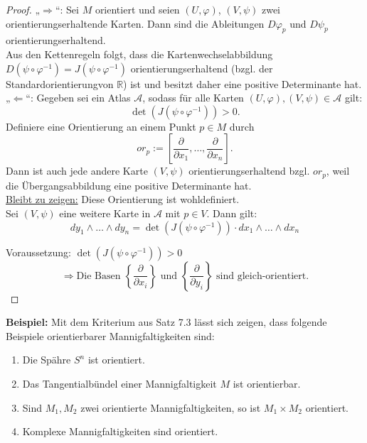 \documentclass[fleqn, 12pt, letterpaper]{article}
\newcommand{\deldel}[2]{\frac{\partial #1}{\partial #2}}
\begin{document}
\begin{proof}
„\(\Rightarrow\)“: Sei \( M \) orientiert und seien \( (U, \varphi) \), \( (V, \psi) \) zwei orientierungserhaltende Karten.  
Dann sind die Ableitungen \( D\varphi_p \) und \( D\psi_p \) orientierungserhaltend.\\

Aus den Kettenregeln folgt, dass die Kartenwechselabbildung \( D(\psi \circ \varphi^{-1}) = J(\psi \circ \varphi^{-1}) \) orientierungserhaltend (bzgl. der Standardorientierungvon $\mathbb{R}$) ist und besitzt daher eine positive Determinante hat.\\

„\(\Leftarrow\)“: Gegeben sei ein Atlas \( \mathcal{A} \), sodass für alle Karten \( (U, \varphi), (V, \psi) \in \mathcal{A} \) gilt:
\[
\det(J(\psi \circ \varphi^{-1})) > 0.
\]
Definiere eine Orientierung an einem Punkt \( p \in M \) durch
\[
or_p := [\deldel{}{x_1},\dots, \deldel{}{x_n}].
\]
Dann ist auch jede andere Karte \( (V, \psi) \) orientierungserhaltend bzgl. \( or_p \), weil die Übergangsabbildung eine positive Determinante hat.\\

\underline{Bleibt zu zeigen:} Diese Orientierung ist wohldefiniert.\\
Sei \( (V, \psi) \) eine weitere Karte in \( \mathcal{A} \) mit \( p \in V \). Dann gilt:
\[
dy_1 \wedge \dots \wedge dy_n = \det\left( J(\psi \circ \varphi^{-1}) \right) \cdot dx_1 \wedge \dots \wedge dx_n
\]

{Voraussetzung:} \( \det\left( J(\psi \circ \varphi^{-1}) \right) > 0 \)
\[
\Rightarrow \text{Die Basen } \left\{ \frac{\partial}{\partial x_i} \right\} \text{ und } \left\{ \frac{\partial}{\partial y_i} \right\} \text{ sind gleich-orientiert.}
\]
\end{proof}


\textbf{Beispiel:}  
Mit dem Kriterium aus Satz 7.3 lässt sich zeigen, dass folgende Beispiele orientierbarer Mannigfaltigkeiten sind:

\begin{enumerate}[label=\roman*)]
    \item Die Spähre \( S^n \) ist orientiert.
    
    \item Das Tangentialbündel einer Mannigfaltigkeit \( M \) ist orientierbar.
    
    \item Sind \( M_1, M_2 \) zwei orientierte Mannigfaltigkeiten, so ist \( M_1 \times M_2 \) orientiert.
    
    \item Komplexe Mannigfaltigkeiten sind orientiert.
\end{enumerate}
\end{document}
